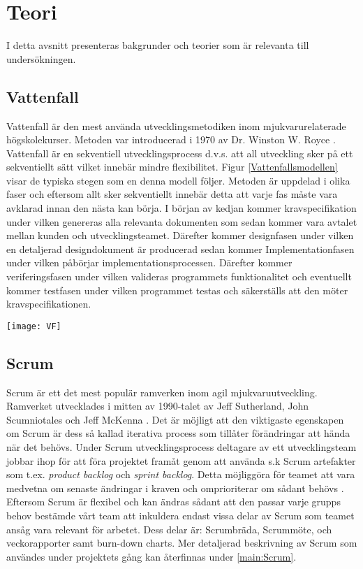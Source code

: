 \section{Teori} \label{sec:Lieth_Wahid-theory}
I detta avsnitt presenteras bakgrunder och teorier som är relevanta till undersökningen. 
\subsection{Vattenfall}
Vattenfall är den mest använda utvecklingsmetodiken inom mjukvarurelaterade högskolekurser. Metoden var introducerad i 1970 \cite{WaterfalM} av Dr. Winston W. Royce \cite{royce1987managing}. Vattenfall är en sekventiell utvecklingsprocess d.v.s. att all utveckling sker på ett sekventiellt sätt vilket innebär mindre flexibilitet. Figur \ref{Vattenfallsmodellen} visar de typiska 
stegen som en denna modell följer. Metoden är uppdelad i olika faser och eftersom allt sker sekventiellt innebär detta att varje fas måste vara avklarad innan den nästa kan börja.  I början av kedjan kommer kravspecifikation under vilken genereras alla relevanta dokumenten som sedan kommer vara avtalet mellan kunden och utvecklingsteamet\cite{ASEEPEER95:online,}. Därefter kommer designfasen under vilken en detaljerad designdokument är producerad sedan kommer Implementationfasen under vilken påbörjar implementationsprocessen. Därefter kommer veriferingsfasen under vilken valideras programmets funktionalitet och eventuellt kommer testfasen under vilken programmet testas och säkerställs att den möter kravspecifikationen.
\begin{figure*}[h]
	\centering
	\texttt{[image: VF]}
	\caption{Vattenfallsmodellen}
	\label{Vattenfallsmodellen}
\end{figure*}
\subsection{Scrum}
Scrum är ett det mest populär ramverken inom agil mjukvaruutveckling. Ramverket utvecklades i mitten av 1990-talet av Jeff Sutherland, John Scumniotales och Jeff McKenna \cite{AgileToo72:online}. Det är möjligt att den viktigaste egenskapen om Scrum är dess så kallad iterativa process som tillåter förändringar att hända när det behövs. Under Scrum utvecklingsprocess deltagare av ett utvecklingsteam jobbar ihop för att föra projektet framåt genom att använda s.k Scrum artefakter som t.ex. \textit{product backlog} och \textit{sprint backlog}. Detta möjliggöra för teamet att vara medvetna om senaste ändringar i kraven och omprioriterar om sådant behövs \cite{aamir2017incorporating}. Eftersom Scrum är flexibel och kan ändras sådant att den passar varje grupps behov bestämde vårt team att inkuldera endast vissa delar av Scrum som teamet ansåg vara relevant för arbetet. Dess delar är:
Scrumbräda, Scrummöte, och veckorapporter samt burn-down charts. Mer detaljerad beskrivning av Scrum som användes under projektets gång kan återfinnas under \ref{main:Scrum}.
